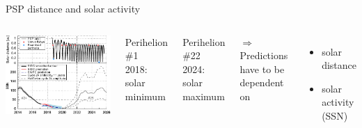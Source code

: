 \begin{frame}[plain,c]{PSP distance and solar activity}{}
	\begin{columns}[c]
		
		\includegraphics[width=\textwidth]{../figures_paper/SPP_orbit_predicted_SSN_overview_f_plot.pdf}

		
		Perihelion \#1\\
		2018: solar minimum\\\ 
		
		Perihelion \#22\\
		2024: solar maximum\\\ 
		
		$\Rightarrow$ Predictions have to be dependent on
		\begin{itemize}
			\item solar distance
			\item solar activity (SSN)
		\end{itemize}


	\end{columns}
\end{frame}

